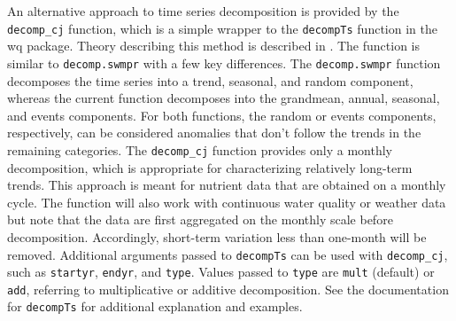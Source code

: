 \documentclass[10pt,letterpaper]{article}\usepackage[]{graphicx}\usepackage[]{color}
\begin{document}
An alternative approach to time series decomposition is provided by the \texttt{decomp\_cj} function, which is a simple wrapper to the \texttt{decompTs} function in the wq package.  Theory describing this method is described in \cite{Cloern10}.  The function is similar to \texttt{decomp.swmpr} with a few key differences.  The \texttt{decomp.swmpr} function decomposes the time series into a trend, seasonal, and random component, whereas the current function decomposes into the grandmean, annual, seasonal, and events components.  For both functions, the random or events components, respectively, can be considered anomalies that don't follow the trends in the remaining categories.  The \texttt{decomp\_cj} function provides only a monthly decomposition, which is appropriate for characterizing relatively long-term trends.  This approach is meant for nutrient data that are obtained on a monthly cycle.  The function will also work with continuous water quality or weather data but note that the data are first aggregated on the monthly scale before decomposition.  Accordingly, short-term variation less than one-month will be removed. Additional arguments passed to \texttt{decompTs} can be used with \texttt{decomp\_cj}, such as \texttt{startyr}, \texttt{endyr}, and \texttt{type}.  Values passed to \texttt{type} are \texttt{mult} (default) or \texttt{add}, referring to multiplicative or additive decomposition.  See the documentation for \texttt{decompTs} for additional explanation and examples.   
\end{document}
